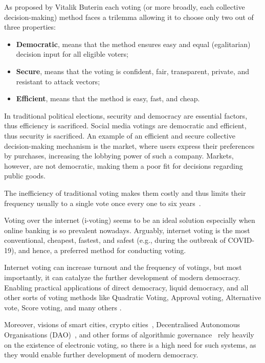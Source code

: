 \documentclass[runningheads]{llncs}
\begin{document}
As proposed by Vitalik Buterin\cite{buterinBlockchainVotingOverrated2021} each voting (or more broadly, each collective decision-making) method faces a trilemma allowing it to choose only two out of three properties:

\begin{itemize}
    \item \textbf{Democratic}, means that the method ensures easy and equal (egalitarian) decision input for all eligible voters;
    \item \textbf{Secure}, means that the voting is confident, fair, transparent, private, and resistant to attack vectors;
    \item \textbf{Efficient}, means that the method is easy, fast, and cheap.
\end{itemize}

In traditional political elections, security and democracy are essential factors, thus efficiency is sacrificed. Social media votings are democratic and efficient, thus security is sacrificed. An example of an efficient and secure collective decision-making mechanism is the market, where users express their preferences by purchases, increasing the lobbying power of such a company. Markets, however, are not democratic, making them a poor fit for decisions regarding public goods. 

The inefficiency of traditional voting makes them costly and thus limits their frequency usually to a single vote once every one to six years~\cite{buterinBlockchainVotingOverrated2021}.

Voting over the internet (i-voting) seems to be an ideal solution especially when online banking is so prevalent nowadays. Arguably, internet voting is the most conventional, cheapest, fastest, and safest (e.g., during the outbreak of COVID-19), and hence, a preferred method for conducting voting.

Internet voting can increase turnout and the frequency of votings, but most importantly, it can catalyze the further development of modern democracy. Enabling practical applications of direct democracy, liquid democracy, and all other sorts of voting methods like Quadratic Voting, Approval voting, Alternative vote, Score voting, and many others \cite{laslierLoserPluralityVoting2011}.

Moreover, visions of smart cities, crypto cities~\cite{buterinCryptoCities2021}, Decentralised Autonomous Organisations (DAO)~\cite{wangDecentralizedAutonomousOrganizations2019}, and other forms of algorithmic governance~\cite{GovernmentAlgorithm2022} rely heavily on the existence of electronic voting, so there is a high need for such systems, as they would enable further development of modern democracy.
\end{document}
